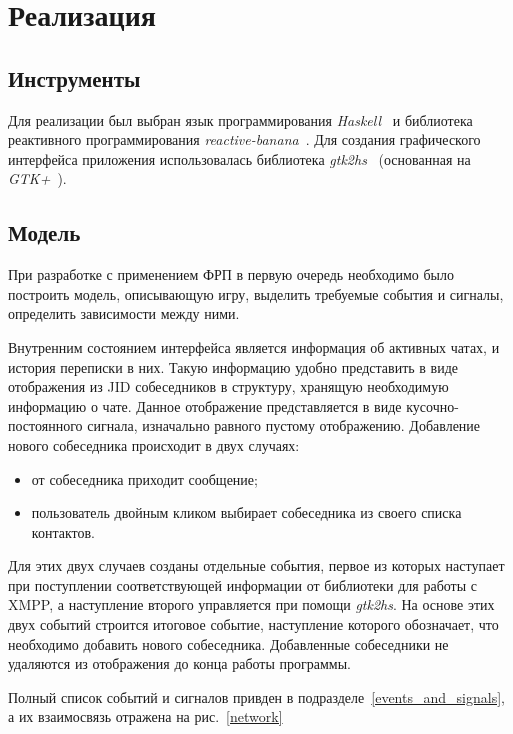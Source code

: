 \section{Реализация}
\subsection{Инструменты}
Для реализации был выбран язык программирования \emph{Haskell}~\cite{haskell} и библиотека реактивного программирования \emph{reactive-banana}~\cite{reactive-banana}.
Для создания графического интерфейса приложения использовалась библиотека \emph{gtk2hs}~\cite{gtk2hs} (основанная на \emph{GTK+}~\cite{gtk}).

\subsection{Модель}
При разработке с применением ФРП в первую очередь необходимо было построить модель, описывающую
игру, выделить требуемые события и сигналы, определить зависимости между ними.

Внутренним состоянием интерфейса является информация об активных чатах, и история переписки в них.
Такую информацию удобно представить в виде отображения из JID собеседников в структуру, хранящую необходимую информацию о чате.
Данное отображение представляется в виде кусочно-постоянного сигнала, изначально равного пустому отображению.
Добавление нового собеседника происходит в двух случаях:
\begin{itemize}
    \item от собеседника приходит сообщение;
    \item пользователь двойным кликом выбирает собеседника из своего списка контактов.
\end{itemize}
Для этих двух случаев созданы отдельные события,
первое из которых наступает при поступлении соответствующей информации от библиотеки для работы с XMPP,
а наступление второго управляется при помощи \emph{gtk2hs}.
На основе этих двух событий строится итоговое событие, наступление которого обозначает, что необходимо добавить нового собеседника.
Добавленные собеседники не удаляются из отображения до конца работы программы.

Полный список событий и сигналов привден в подразделе~\ref{events_and_signals}, а их взаимосвязь отражена на рис.~\ref{network}

